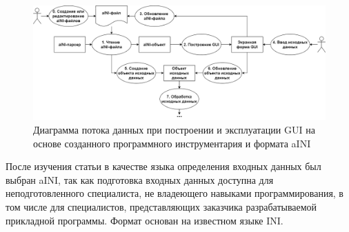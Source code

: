 \begin{figure}[!ht]
  \centering
  \includegraphics[scale=0.35]{ResearchNotes/rndhpc_int_gui_2022_09_29/rndhpcgui.2022.09.29.diagram.png}
  \caption{Диаграмма потока данных при построении и эксплуатации GUI на основе созданного программного инструментария и формата aINI}
  \label{rndhpcgui.2022.09.29.diagram}
\end{figure}

После изучения статьи в качестве языка определения входных данных был выбран aINI, так как подготовка входных данных доступна для неподготовленного специалиста, не владеющего навыками программирования, в том числе для специалистов, представляющих заказчика разрабатываемой прикладной программы. Формат основан на известном языке INI.
\noteattributes{}

